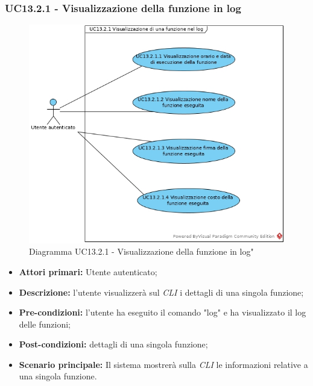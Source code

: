 \subsubsection{UC13.2.1 - Visualizzazione della funzione in log}
\begin{figure}[h]
	\centering
	\includegraphics[width=0.7\linewidth]{res/img/UC13.2.1.jpg}
	\caption{Diagramma UC13.2.1 - Visualizzazione della funzione in log"}
\end{figure}
\begin{itemize}
	\item \textbf{Attori primari:} Utente autenticato;
	\item \textbf{Descrizione:} l'utente visualizzerà sul \textit{CLI\glo} i dettagli di una singola funzione;
	\item \textbf{Pre-condizioni:} l'utente ha eseguito il comando "log" e ha visualizzato il log delle funzioni;
	\item \textbf{Post-condizioni:} dettagli di una singola funzione;
	\item \textbf{Scenario principale:} Il sistema mostrerà sulla \textit{CLI\glo} le informazioni relative a una singola funzione.
\end{itemize}
